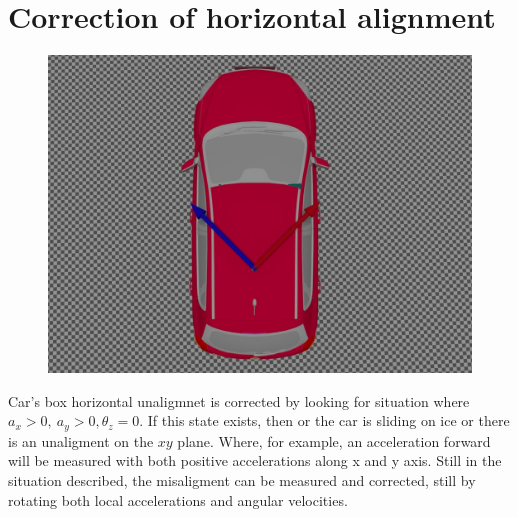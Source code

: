 \section{Correction of horizontal alignment}
\begin{figure}[H]
\includegraphics[width=\textwidth]{kia_bad_xy_align.jpg}
\end{figure}
Car's box horizontal unaligmnet is corrected by looking for situation where $a_x>0, \ a_y>0, \theta_z =0$. If this state exists, then or the car is sliding on ice or there is an unaligment on the $xy$ plane. Where, for example, an acceleration forward will be measured with both positive accelerations along x and y axis. 
Still in the situation described, the misaligment can be measured and corrected, still by rotating both local accelerations and angular velocities.

